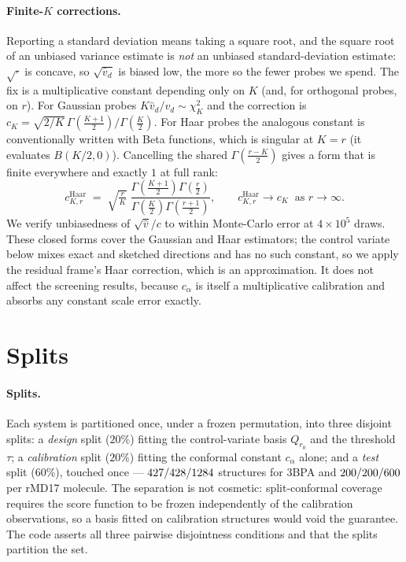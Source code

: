 \documentclass{article}
\begin{document}
\paragraph{Finite-$K$ corrections.}
Reporting a standard deviation means taking a square root, and the square root of an unbiased
variance estimate is \emph{not} an unbiased standard-deviation estimate: $\sqrt{\cdot}$ is concave,
so $\sqrt{\widehat v_d}$ is biased low, the more so the fewer probes we spend. The fix is a
multiplicative constant depending only on $K$ (and, for orthogonal probes, on $r$).
For Gaussian probes $K\widehat v_d/v_d\sim\chi^2_K$ and the
correction is $c_K=\sqrt{2/K}\,\Gamma(\tfrac{K+1}{2})/\Gamma(\tfrac K2)$. For Haar probes the
analogous constant is conventionally written with Beta functions, which is singular at $K=r$
(it evaluates $B(K/2,0)$). Cancelling the shared $\Gamma(\tfrac{r-K}{2})$ gives a form that is
finite everywhere and exactly $1$ at full rank:
\begin{equation}
c^{\mathrm{Haar}}_{K,r}\;=\;\sqrt{\tfrac{r}{K}}\;
\frac{\Gamma\!\left(\tfrac{K+1}{2}\right)\Gamma\!\left(\tfrac r2\right)}
     {\Gamma\!\left(\tfrac K2\right)\Gamma\!\left(\tfrac{r+1}{2}\right)} ,
\qquad c^{\mathrm{Haar}}_{K,r}\to c_K \ \text{ as } r\to\infty .
\end{equation}
We verify unbiasedness of $\sqrt{\widehat v}/c$ to within Monte-Carlo error at $4\times10^5$ draws.
These closed forms cover the Gaussian and Haar estimators; the control variate below mixes exact and
sketched directions and has no such constant, so we apply the residual frame's Haar correction,
which is an approximation. It does not affect the screening results, because $c_\alpha$ is itself a
multiplicative calibration and absorbs any constant scale error exactly.


\section{Splits}
\label{app:splits}
\paragraph{Splits.}
Each system is partitioned once, under a frozen permutation, into three disjoint splits: a
\emph{design} split ($20\%$) fitting the control-variate basis $Q_{r_0}$ and the threshold $\tau$; a
\emph{calibration} split ($20\%$) fitting the conformal constant $c_\alpha$ alone; and a \emph{test}
split ($60\%$), touched once --- $427/428/1284$ structures for
3BPA and $200/200/600$ per rMD17 molecule. The separation is not
cosmetic: split-conformal coverage requires the score function to be frozen independently of the
calibration observations, so a basis fitted on calibration structures would void the guarantee. The
code asserts all three pairwise disjointness conditions and that the splits partition the set.
\end{document}
